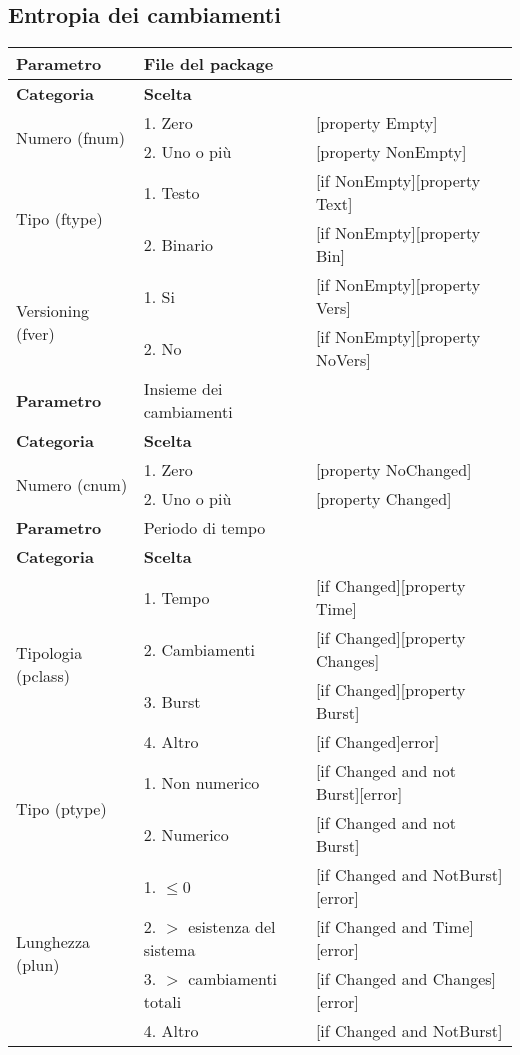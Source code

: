 \subsection{Entropia dei cambiamenti}
		
			\begin{tabular}{|p{4cm}|p{4cm}p{5cm}|}
				\hline
				\cellcolor{Gray} \textbf{Parametro}		& File del package	&											\tabularnewline
				\hline
				\rowcolor{Gray}
				\textbf{Categoria} 						& \textbf{Scelta}			&									\tabularnewline
				\hline
				\multirow{2}{*}{Numero (fnum)} 			& 1. Zero 					&	[property Empty] 				\tabularnewline
				\cline{2-3}
														& 2. Uno o più				&	[property NonEmpty]				\tabularnewline
				\hline
				\multirow{2}{*}{Tipo (ftype)} 			& 1. Testo					&	[if NonEmpty][property Text] 	\tabularnewline
				\cline{2-3}
														& 2. Binario				&	[if NonEmpty][property Bin]		\tabularnewline
				\hline
				\multirow{2}{*}{Versioning (fver)}		& 1. Si						&	[if NonEmpty][property Vers]	\tabularnewline
				\cline{2-3}
														& 2. No						&	[if NonEmpty][property NoVers]	\tabularnewline
				\hline
				
				
				\cellcolor{Gray} \textbf{Parametro}		& Insieme dei cambiamenti	&									\tabularnewline
				\hline
				\rowcolor{Gray}
				\textbf{Categoria} 						& \textbf{Scelta}			&									\tabularnewline
				\hline
				\multirow{2}{*}{Numero (cnum)} 			& 1. Zero 					&	[property NoChanged]			\tabularnewline
				\cline{2-3}
														& 2. Uno o più				&	[property Changed]				\tabularnewline
				\hline	
				
				
				\cellcolor{Gray} \textbf{Parametro}		& Periodo di tempo			&									\tabularnewline
				\hline
				\rowcolor{Gray}
				\textbf{Categoria} 						& \textbf{Scelta}			&									\tabularnewline
				\hline
				\multirow{4}{*}{Tipologia (pclass)} 	& 1. Tempo 					&	[if Changed][property Time]				 	\tabularnewline
				\cline{2-3}
														& 2. Cambiamenti			&	[if Changed][property Changes]				\tabularnewline
				\cline{2-3}
														& 3. Burst 					&	[if Changed][property Burst]				\tabularnewline
				\cline{2-3}
														& 4. Altro 					&	[if Changed]error]							\tabularnewline
				\hline
				\multirow{2}{*}{Tipo (ptype)} 			& 1. Non numerico 			&	[if Changed and not Burst][error]		 	\tabularnewline
				\cline{2-3}
														& 2. Numerico 				&	[if Changed and not Burst]					\tabularnewline
				\hline
				\multirow{4}{*}{Lunghezza (plun)} 		& 1. $\leq 0$					&	[if Changed and NotBurst][error] 		\tabularnewline
				\cline{2-3}
														& 2. $>$ esistenza del sistema 	& 	[if Changed and Time][error]			\tabularnewline
				\cline{2-3}
														& 3. $>$ cambiamenti totali		&	[if Changed and Changes][error]			\tabularnewline
				\cline{2-3}
														& 4. Altro						&	[if Changed and NotBurst]				\tabularnewline
				\hline
			\end{tabular}

